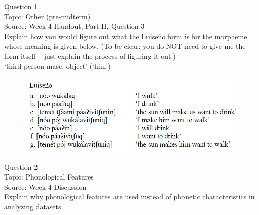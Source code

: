 \documentclass[12pt]{article}
\begin{document}
\begin{center}
\textbf{{\color{blue}{\HUGE START OF EXAM\\}}}

\textbf{{\color{blue}{\HUGE Student ID: 52421\\}}}

\textbf{{\color{blue}{\HUGE 4:20\\}}}

\end{center}
\newpage

{\large Question 1}\\

Topic: Other (pre-midterm)\\
Source: Week 4 Handout, Part II, Question 3\\

Explain how you would figure out what the Luiseño form is for the morpheme whose meaning is given below. (To be clear: you do NOT need to give me the form itself -- just explain the process of figuring it out.)\\

‘third person masc. object’ (‘him’)

\begin{figure}[H]
\includegraphics{../images/luiseno.png}
\end{figure}

\newpage

{\large Question 2}\\

Topic: Phonological Features\\
Source: Week 4 Discussion\\

Explain why phonological features are used instead of phonetic characteristics in analyzing datasets.\\


\newpage

\begin{center}
\textbf{{\color{red}{\HUGE END OF EXAM}}}\\

\end{center}
\newpage
\end{document}
